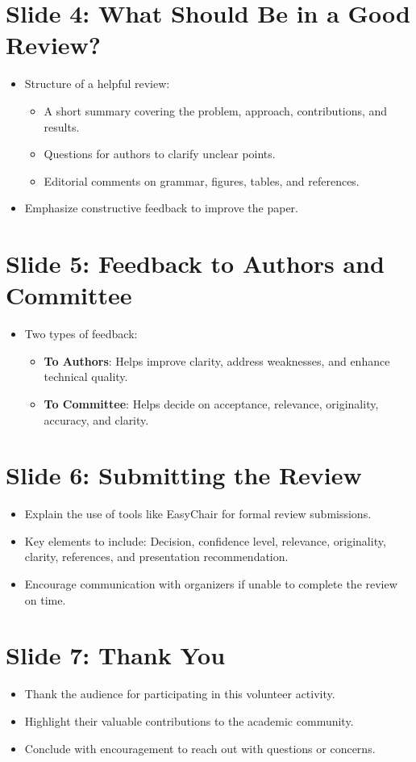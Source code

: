 \documentclass{article}
\begin{document}
\section*{Slide 4: What Should Be in a Good Review?}
\begin{itemize}
    \item Structure of a helpful review:
        \begin{itemize}
            \item A short summary covering the problem, approach, contributions, and results.
            \item Questions for authors to clarify unclear points.
            \item Editorial comments on grammar, figures, tables, and references.
        \end{itemize}
    \item Emphasize constructive feedback to improve the paper.
\end{itemize}

\section*{Slide 5: Feedback to Authors and Committee}
\begin{itemize}
    \item Two types of feedback:
        \begin{itemize}
            \item \textbf{To Authors}: Helps improve clarity, address weaknesses, and enhance technical quality.
            \item \textbf{To Committee}: Helps decide on acceptance, relevance, originality, accuracy, and clarity.
        \end{itemize}
\end{itemize}

\section*{Slide 6: Submitting the Review}
\begin{itemize}
    \item Explain the use of tools like EasyChair for formal review submissions.
    \item Key elements to include: Decision, confidence level, relevance, originality, clarity, references, and presentation recommendation.
    \item Encourage communication with organizers if unable to complete the review on time.
\end{itemize}

\section*{Slide 7: Thank You}
\begin{itemize}
    \item Thank the audience for participating in this volunteer activity.
    \item Highlight their valuable contributions to the academic community.
    \item Conclude with encouragement to reach out with questions or concerns.
\end{itemize}
\end{document}
